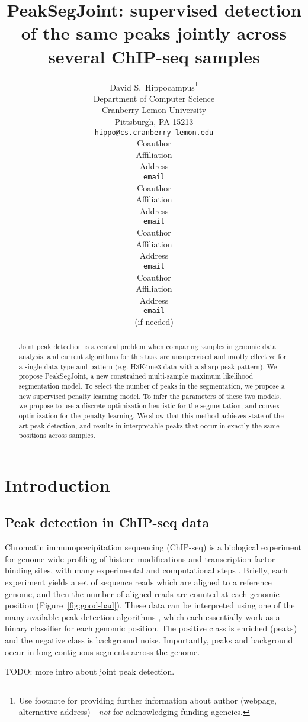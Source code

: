 \documentclass{article} %
\title{PeakSegJoint: supervised detection of the same peaks jointly
  across several ChIP-seq samples}
\author{
David S.~Hippocampus\thanks{ Use footnote for providing further information
about author (webpage, alternative address)---\emph{not} for acknowledging
funding agencies.} \\
Department of Computer Science\\
Cranberry-Lemon University\\
Pittsburgh, PA 15213 \\
\texttt{hippo@cs.cranberry-lemon.edu} \\
\And
Coauthor \\
Affiliation \\
Address \\
\texttt{email} \\
\AND
Coauthor \\
Affiliation \\
Address \\
\texttt{email} \\
\And
Coauthor \\
Affiliation \\
Address \\
\texttt{email} \\
\And
Coauthor \\
Affiliation \\
Address \\
\texttt{email} \\
(if needed)\\
}
\begin{document}
\maketitle

\begin{abstract}
  Joint peak detection is a central problem when comparing samples in
  genomic data analysis, and current algorithms for this task are
  unsupervised and mostly effective for a single data type and pattern
  (e.g. H3K4me3 data with a sharp peak pattern). We propose
  PeakSegJoint, a new constrained multi-sample maximum likelihood
  segmentation model. To select the number of peaks in the
  segmentation, we propose a new supervised penalty learning model. To
  infer the parameters of these two models, we propose to use a
  discrete optimization heuristic for the segmentation, and convex
  optimization for the penalty learning. We show that this method
  achieves state-of-the-art peak detection, and results in
  interpretable peaks that occur in exactly the same positions across
  samples.
\end{abstract}

\section{Introduction}

\subsection{Peak detection in ChIP-seq data}

Chromatin immunoprecipitation sequencing (ChIP-seq) is a biological
experiment for genome-wide profiling of histone modifications and
transcription factor binding sites, with many experimental and
computational steps \citep{practical}. Briefly, each experiment yields
a set of sequence reads which are aligned to a reference genome, and
then the number of aligned reads are counted at each genomic position
(Figure~\ref{fig:good-bad}). These data can be interpreted using
one of the many available peak detection algorithms
\citep{evaluation2010, rye2010manually, chip-seq-bench}, which each
essentially work as a binary classifier for each genomic position. The
positive class is enriched (peaks) and the negative class is
background noise. Importantly, peaks and background occur in long
contiguous segments across the genome.

TODO: more intro about joint peak detection.
\end{document}
